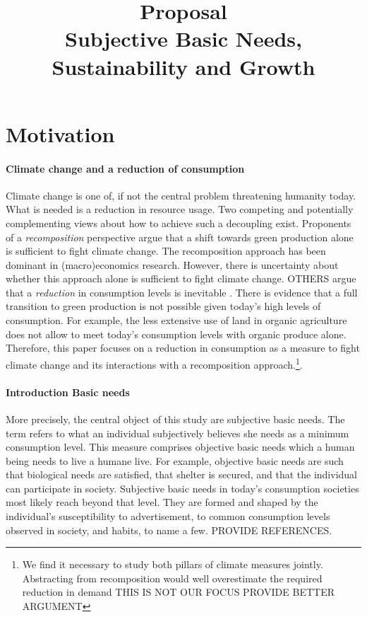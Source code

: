 \documentclass[12pt]{article}
\title{Proposal \\ Subjective Basic Needs, Sustainability and Growth}
\date{}
\begin{document}
	\maketitle
	\tableofcontents
\section{Motivation}

\paragraph{Climate change and a reduction of consumption}
Climate change is one of, if not the central problem threatening humanity today. 
What is needed is a reduction in resource usage. Two competing and potentially complementing views about how to achieve such a decoupling exist. 
Proponents of a \textit{recomposition} perspective argue that a shift towards green production alone is sufficient to fight climate change. 
The recomposition approach has been dominant in (macro)economics research. However, there is uncertainty about whether this approach alone is sufficient to fight climate change.
OTHERS argue  that a \textit{reduction} in consumption levels is inevitable \citep[compare][]{Gough2015ClimateNeeds}. 
There is evidence that a full transition to green production is not possible given today's high levels of consumption. 
For example, the less extensive use of land in organic agriculture does not allow to meet today's consumption levels with organic produce alone. 
Therefore,  this paper focuses on a reduction in consumption as a measure to fight climate change and its interactions with a recomposition approach.\footnote{We find it necessary to study both pillars of climate measures jointly. Abstracting from recomposition would well overestimate the required reduction in demand THIS IS NOT OUR FOCUS PROVIDE BETTER ARGUMENT }.

\paragraph{Introduction Basic needs}
 More precisely, the central object of this study are subjective basic needs. The term refers to what an individual subjectively believes she needs as a minimum consumption level. This measure comprises objective basic needs which a human being needs to live a humane live. 
 For example, objective basic needs are such that biological needs are satisfied, that shelter is secured, and that the individual can participate in society. 
Subjective basic needs in today's consumption societies most likely reach beyond that level. They are formed and shaped by the individual's susceptibility to advertisement, to common consumption levels observed in society, and habits, to name a few. PROVIDE REFERENCES. 
\end{document}
